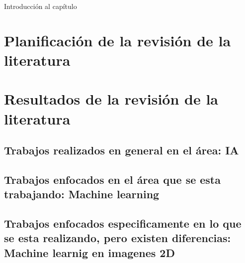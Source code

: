 
Introducción al capítulo

\section{Planificación de la revisión de la literatura}

\section{Resultados de la revisión de la literatura}


\subsection{Trabajos realizados en general en el área:  IA}
\subsection{Trabajos enfocados en el área que se esta trabajando: Machine learning}
\subsection{Trabajos enfocados especificamente en lo que se esta realizando, pero existen diferencias: Machine learnig en imagenes 2D}

